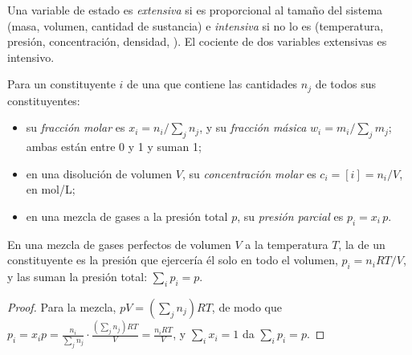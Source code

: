 \begin{definition}\label{def:b1:extent-q-and-k:variables}
Una variable de estado es \emph{extensiva} si es
proporcional al tamaño del sistema (masa, volumen, cantidad de sustancia)
e \emph{intensiva} si no lo es (temperatura,
presión, concentración, densidad, ). El cociente de dos
variables extensivas es intensivo.
\end{definition}

\begin{definition}\label{def:b1:extent-q-and-k:composition}
Para un constituyente $i$ de una  que contiene las cantidades $n_j$
de todos sus constituyentes:
\begin{itemize}
  \item su \emph{fracción molar} es $x_i = n_i/\sum_j
        n_j$, y su \emph{fracción másica} $w_i =
        m_i/\sum_j m_j$; ambas están entre 0 y 1 y suman 1;
  \item en una disolución de volumen $V$, su \emph{concentración
        molar} es $c_i = [i] = n_i/V$,
        en \unit{mol/L};
  \item en una mezcla de gases a la presión total $p$, su \emph{presión
        parcial} es $p_i = x_i\,p$.
\end{itemize}
\end{definition}

\begin{proposition}\label{prop:b1:extent-q-and-k:dalton}
En una mezcla de gases perfectos de volumen $V$ a la temperatura $T$, la
 de un constituyente es la presión que ejercería él solo
en todo el volumen, $p_i = n_iRT/V$, y las  suman la
presión total: $\sum_i p_i = p$.
\end{proposition}

\begin{proof}
Para la mezcla, $pV = (\sum_j n_j)RT$, de modo que $p_i = x_i p = \frac{n_i}{\sum_j
n_j}\cdot\frac{(\sum_j n_j)RT}{V} = \frac{n_iRT}{V}$, y $\sum_i x_i = 1$
da $\sum_i p_i = p$.
\end{proof}

